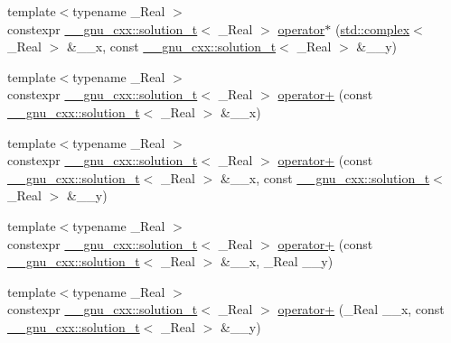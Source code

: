 \begin{DoxyCompactItemize}
\item 
{\footnotesize template$<$typename \+\_\+\+Real $>$ }\\constexpr \hyperlink{namespace____gnu__cxx_ae20ea642de50eb361074c62676b0159c}{\+\_\+\+\_\+gnu\+\_\+cxx\+::solution\+\_\+t}$<$ \+\_\+\+Real $>$ \hyperlink{namespacestd_ae82d1f9ca11a46b93a33f2f89ce71305}{operator$\ast$} (\hyperlink{classstd_1_1complex}{std\+::complex}$<$ \+\_\+\+Real $>$ \&\+\_\+\+\_\+x, const \hyperlink{namespace____gnu__cxx_ae20ea642de50eb361074c62676b0159c}{\+\_\+\+\_\+gnu\+\_\+cxx\+::solution\+\_\+t}$<$ \+\_\+\+Real $>$ \&\+\_\+\+\_\+y)
\item 
{\footnotesize template$<$typename \+\_\+\+Real $>$ }\\constexpr \hyperlink{namespace____gnu__cxx_ae20ea642de50eb361074c62676b0159c}{\+\_\+\+\_\+gnu\+\_\+cxx\+::solution\+\_\+t}$<$ \+\_\+\+Real $>$ \hyperlink{namespacestd_a49a4eaaa2e023275443b1854bc90c77d}{operator+} (const \hyperlink{namespace____gnu__cxx_ae20ea642de50eb361074c62676b0159c}{\+\_\+\+\_\+gnu\+\_\+cxx\+::solution\+\_\+t}$<$ \+\_\+\+Real $>$ \&\+\_\+\+\_\+x)
\item 
{\footnotesize template$<$typename \+\_\+\+Real $>$ }\\constexpr \hyperlink{namespace____gnu__cxx_ae20ea642de50eb361074c62676b0159c}{\+\_\+\+\_\+gnu\+\_\+cxx\+::solution\+\_\+t}$<$ \+\_\+\+Real $>$ \hyperlink{namespacestd_ad34e888e243a1ad8303966f3cfe7a690}{operator+} (const \hyperlink{namespace____gnu__cxx_ae20ea642de50eb361074c62676b0159c}{\+\_\+\+\_\+gnu\+\_\+cxx\+::solution\+\_\+t}$<$ \+\_\+\+Real $>$ \&\+\_\+\+\_\+x, const \hyperlink{namespace____gnu__cxx_ae20ea642de50eb361074c62676b0159c}{\+\_\+\+\_\+gnu\+\_\+cxx\+::solution\+\_\+t}$<$ \+\_\+\+Real $>$ \&\+\_\+\+\_\+y)
\item 
{\footnotesize template$<$typename \+\_\+\+Real $>$ }\\constexpr \hyperlink{namespace____gnu__cxx_ae20ea642de50eb361074c62676b0159c}{\+\_\+\+\_\+gnu\+\_\+cxx\+::solution\+\_\+t}$<$ \+\_\+\+Real $>$ \hyperlink{namespacestd_a57af80492f51cac0e5c9cde7ea2ca845}{operator+} (const \hyperlink{namespace____gnu__cxx_ae20ea642de50eb361074c62676b0159c}{\+\_\+\+\_\+gnu\+\_\+cxx\+::solution\+\_\+t}$<$ \+\_\+\+Real $>$ \&\+\_\+\+\_\+x, \+\_\+\+Real \+\_\+\+\_\+y)
\item 
{\footnotesize template$<$typename \+\_\+\+Real $>$ }\\constexpr \hyperlink{namespace____gnu__cxx_ae20ea642de50eb361074c62676b0159c}{\+\_\+\+\_\+gnu\+\_\+cxx\+::solution\+\_\+t}$<$ \+\_\+\+Real $>$ \hyperlink{namespacestd_a6f47cf71b7277a461d5627a46748abe1}{operator+} (\+\_\+\+Real \+\_\+\+\_\+x, const \hyperlink{namespace____gnu__cxx_ae20ea642de50eb361074c62676b0159c}{\+\_\+\+\_\+gnu\+\_\+cxx\+::solution\+\_\+t}$<$ \+\_\+\+Real $>$ \&\+\_\+\+\_\+y)

\end{DoxyCompactItemize}
